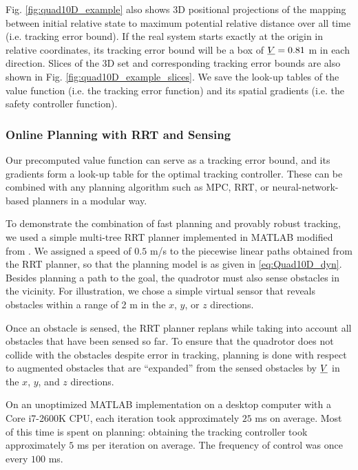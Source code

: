 Fig. \ref{fig:quad10D_example} also shows 3D positional projections of the mapping between initial relative state to maximum potential relative distance over all time (i.e. tracking error bound). If the real system starts exactly at the origin in relative coordinates, its tracking error bound will be a box of $\underline{V} = 0.81$ m in each direction. Slices of the 3D set and corresponding tracking error bounds are also shown in Fig. \ref{fig:quad10D_example_slices}. We save the look-up tables of the value function (i.e. the tracking error function) and its spatial gradients (i.e. the safety controller function).

\subsubsection{Online Planning with RRT and Sensing}
Our precomputed value function can serve as a tracking error bound, and its gradients form a look-up table for the optimal tracking controller. These can be combined with any planning algorithm such as MPC, RRT, or neural-network-based planners in a modular way. 

To demonstrate the combination of fast planning and provably robust tracking, we used a simple multi-tree RRT planner implemented in MATLAB modified from \cite{Gavin2013}. We assigned a speed of $0.5$ m/s to the piecewise linear paths obtained from the RRT planner, so that the planning model is as given in \eqref{eq:Quad10D_dyn}. Besides planning a path to the goal, the quadrotor must also sense obstacles in the vicinity. For illustration, we chose a simple virtual sensor that reveals obstacles within a range of 2 m in the $x$, $y$, or $z$ directions.

Once an obstacle is sensed, the RRT planner replans while taking into account all obstacles that have been sensed so far. To ensure that the quadrotor does not collide with the obstacles despite error in tracking, planning is done with respect to augmented obstacles that are ``expanded'' from the sensed obstacles by $\underline{V}$ in the $x$, $y$, and $z$ directions.

On an unoptimized MATLAB implementation on a desktop computer with a Core i7-2600K CPU, each iteration took approximately $25$ ms on average. Most of this time is spent on planning: obtaining the tracking controller took approximately $5$ ms per iteration on average. The frequency of control was once every $100$ ms.

